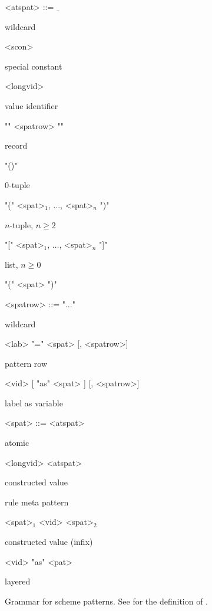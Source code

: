 \begin{nonfloatingfigure}

\setlength{\grammarindent}{7em}

\newcommand{\cmt}[1]{\parbox{8em}{\small{#1}}}

\begin{grammar}
  <atspat> ::= $\_$                              \hfill \cmt{wildcard}
  \alt <scon>                                    \hfill \cmt{special constant}
  \alt ["op"] <longvid>                          \hfill \cmt{value identifier}
  \alt "{" <spatrow> "}"                         \hfill \cmt{record}
  \alt "()"                                      \hfill \cmt{$0$-tuple}
  \alt "(" <spat>$_1$, $\ldots$, <spat>$_n$ ")"  \hfill \cmt{$n$-tuple, $n \geq  2$}
  \alt "[" <spat>$_1$, $\ldots$, <spat>$_n$ "]"  \hfill \cmt{list, $n \geq 0$}
  \alt "(" <spat> ")" 

  <spatrow> ::= "..."                      \hfill \cmt{wildcard}
  \alt <lab> "=" <spat> [, <spatrow>]      \hfill \cmt{pattern row}
  \alt <vid> [ "as" <spat> ] [, <spatrow>] \hfill \cmt{label as variable}

  <spat> ::= <atspat>                      \hfill \cmt{atomic}
  \alt ["op"] <longvid> <atspat>           \hfill \cmt{constructed value}
                   \hfill \cmt{rule meta pattern}
  \alt <spat>$_1$ <vid> <spat>$_2$         \hfill \cmt{constructed value (infix)}
  \alt ["op"] <vid> "as" <pat>             \hfill \cmt{layered}
\end{grammar}
  
  \caption{Grammar for scheme patterns. See  for
    the definition of .}
  \label{fig:scheme-patterns}
\end{nonfloatingfigure}

